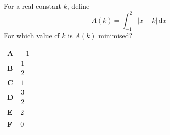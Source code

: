 \documentclass[11pt,a4paper]{article}
\begin{document}
\clearpage
\thispagestyle{djspaper}
\vspace*{8pt}
\begin{enumerate}[label=\textbf{\arabic*.},leftmargin=*,itemsep=0pt,start=7]
\questionitem[Integration]
For a real constant $k$, define \[ A(k)=\int_{-1}^{2} |x-k|\,\mathrm{d}x \] For which value of $k$ is $A(k)$ minimised?

\par\vspace*{12pt}
\begin{tabularx}{\linewidth}{@{}>{\bfseries}l Y@{}}
A &
$-1$
\\[0.8em]
B &
$\dfrac{1}{2}$
\\[0.8em]
C &
$1$
\\[0.8em]
D &
$\dfrac{3}{2}$
\\[0.8em]
E &
$2$
\\[0.8em]
F &
$0$
\\
\end{tabularx}
\end{enumerate}
\clearpage
\thispagestyle{djspaper}
\vspace*{8pt}
\end{document}
